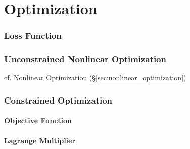 \part{Optimization}\label{part:optimization}

\section{Loss Function}\label{sec:loss_function}


\section{Unconstrained Nonlinear Optimization}
\label{sec:unconstrained_nonlinear}

\fist cf. Nonlinear Optimization (\S\ref{sec:nonlinear_optimization})



\section{Constrained Optimization}\label{sec:constrined_optimization}

\subsection{Objective Function}\label{sec:objective_function}

\subsection{Lagrange Multiplier}\label{sec:lagrange_multiplier}

